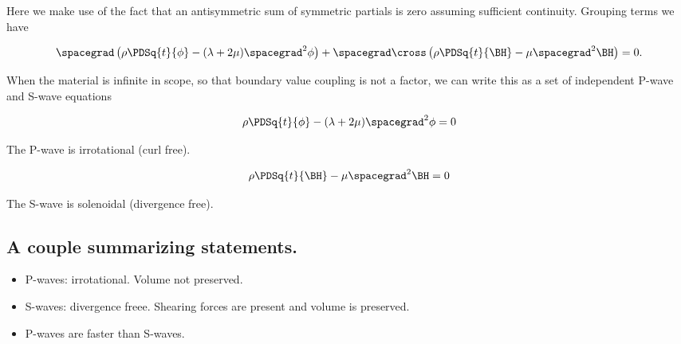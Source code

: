 Here we make use of the fact that an antisymmetric sum of symmetric partials is zero assuming sufficient continuity.  Grouping terms we have

\begin{equation}\label{eqn:continuumL7:450}
\spacegrad 
\left(
\rho \PDSq{t}{\phi} - (\lambda + 2\mu) \spacegrad^2 \phi
\right)
+ 
\spacegrad \cross 
\left(
\rho \PDSq{t}{\BH} - \mu \spacegrad^2 \BH
\right)
= 0.
\end{equation}

When the material is infinite in scope, so that boundary value coupling is not a factor, we can write this as a set of independent P-wave and S-wave equations

\begin{equation}\label{eqn:continuumL7:470}
\rho \PDSq{t}{\phi} - (\lambda + 2\mu) \spacegrad^2 \phi = 0
\end{equation}

The P-wave is irrotational (curl free).

\begin{equation}\label{eqn:continuumL7:490}
\rho \PDSq{t}{\BH} - \mu \spacegrad^2 \BH = 0
\end{equation}

The S-wave is solenoidal (divergence free).

\subsection{A couple summarizing statements.}

\begin{itemize}
\item 
P-waves: irrotational.  Volume not preserved.
\item 
S-waves: divergence freee.  Shearing forces are present and volume is preserved.
\item 
P-waves are faster than S-waves.
\end{itemize}

\EndArticle
